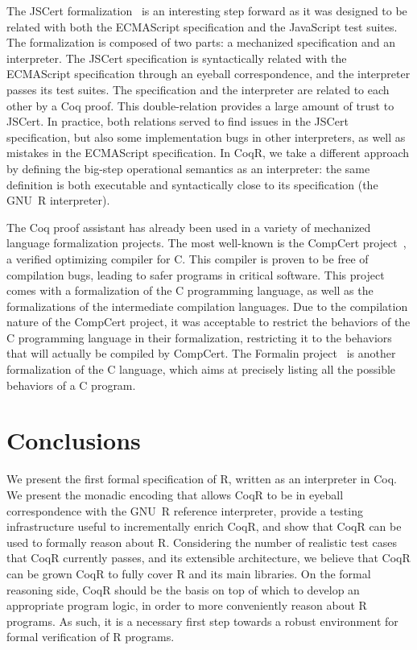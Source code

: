 \documentclass[
    sigplan,
    10pt,
    review, %
    natbib=false %
 ]{acmart}
\newcommand\CoqR{CoqR}
\begin{document}
The JSCert formalization~\parencite{popl14jscert}
is an interesting step forward as it was designed
to be related with both the ECMAScript specification and the JavaScript test suites.
The formalization is composed of two parts: a mechanized specification and an interpreter. The JSCert specification is syntactically related with the ECMAScript specification through an eyeball correspondence, and the interpreter passes its test suites.
The specification and the interpreter are related to each other by a Coq proof.
This double-relation provides a large amount of trust to JSCert.
In practice, both relations served to find issues in the JSCert specification,
but also some implementation bugs in other interpreters,
as well as mistakes in the ECMAScript specification.
In \CoqR, we take a different approach by defining the big-step operational semantics as an interpreter: the same definition is both executable and syntactically close to its specification (the GNU~R interpreter).

The Coq proof assistant has already been used
in a variety of mechanized language formalization projects.
The most well-known is the CompCert project~\cite{Leroy-Compcert-CACM},
a verified optimizing compiler for C.
This compiler is proven to be free of compilation bugs,
leading to safer programs in critical software.
This project comes with a formalization of the C programming language,
as well as the formalizations of the intermediate compilation languages.
%
Due to the compilation nature of the CompCert project,
it was acceptable to restrict the behaviors of the C programming language
in their formalization,
restricting it to the behaviors that will actually be compiled by CompCert.
The Formalin project~\parencite{formalin} is another formalization
of the C language, which aims at precisely listing all the possible behaviors of a C program.

\section{Conclusions}
\label{sec:conclusion}

We present the first formal specification of R, written as an interpreter in Coq. We present the monadic encoding that allows \CoqR{} to be in eyeball correspondence with the GNU~R reference interpreter, provide a testing infrastructure useful to incrementally enrich \CoqR, and show that \CoqR{} can be used to formally reason about R. Considering the number of realistic test cases that \CoqR{} currently passes, and its extensible architecture, we believe that \CoqR{} can be grown \CoqR{} to fully cover R and its main libraries. On the formal reasoning side, \CoqR{} should be the basis on top of which to develop an appropriate program logic, in order to more conveniently reason about R programs. As such, it is a necessary first step towards a robust environment for formal verification of R programs.

\printbibliography{}
\end{document}

